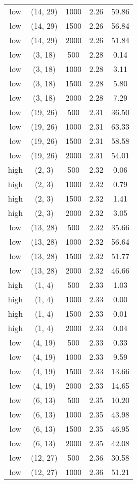 \begin{tabular}{c c c c c}
low & (14, 29) &  1000 & 2.26 & 59.86 \\
low & (14, 29) &  1500 & 2.26 & 56.84 \\
low & (14, 29) &  2000 & 2.26 & 51.84 \\
low & (3, 18) &  500 & 2.28 & 0.14 \\
low & (3, 18) &  1000 & 2.28 & 3.11 \\
low & (3, 18) &  1500 & 2.28 & 5.80 \\
low & (3, 18) &  2000 & 2.28 & 7.29 \\
low & (19, 26) &  500 & 2.31 & 36.50 \\
low & (19, 26) &  1000 & 2.31 & 63.33 \\
low & (19, 26) &  1500 & 2.31 & 58.58 \\
low & (19, 26) &  2000 & 2.31 & 54.01 \\
high & (2, 3) &  500 & 2.32 & 0.06 \\
high & (2, 3) &  1000 & 2.32 & 0.79 \\
high & (2, 3) &  1500 & 2.32 & 1.41 \\
high & (2, 3) &  2000 & 2.32 & 3.05 \\
low & (13, 28) &  500 & 2.32 & 35.66 \\
low & (13, 28) &  1000 & 2.32 & 56.64 \\
low & (13, 28) &  1500 & 2.32 & 51.77 \\
low & (13, 28) &  2000 & 2.32 & 46.66 \\
high & (1, 4) &  500 & 2.33 & 1.03 \\
high & (1, 4) &  1000 & 2.33 & 0.00 \\
high & (1, 4) &  1500 & 2.33 & 0.01 \\
high & (1, 4) &  2000 & 2.33 & 0.04 \\
low & (4, 19) &  500 & 2.33 & 0.33 \\
low & (4, 19) &  1000 & 2.33 & 9.59 \\
low & (4, 19) &  1500 & 2.33 & 13.66 \\
low & (4, 19) &  2000 & 2.33 & 14.65 \\
low & (6, 13) &  500 & 2.35 & 10.20 \\
low & (6, 13) &  1000 & 2.35 & 43.98 \\
low & (6, 13) &  1500 & 2.35 & 46.95 \\
low & (6, 13) &  2000 & 2.35 & 42.08 \\
low & (12, 27) &  500 & 2.36 & 30.58 \\
low & (12, 27) &  1000 & 2.36 & 51.21 \\

\end{tabular}
